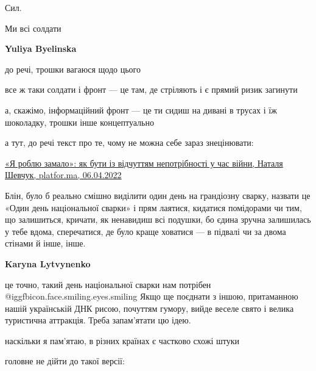  
 
 
 
 
\zzSecCmt

\begin{itemize} %
Сил.

Ми всі солдати

\textbf{Yuliya Byelinska} 

до речі, трошки вагаюся щодо цього

все ж таки солдати і фронт — це там, де стріляють і є прямий ризик загинути

а, скажімо, інформаційний фронт — це ти сидиш на дивані в трусах і їж
шоколадку, трошки інше концептуально

а тут, до речі текст про те, чому не можна себе зараз знецінювати:

\href{https://platfor.ma/topic/ya-roblyu-zamalo-yak-buty-iz-vidchuttyam-nepotribnosti-u-chas-vijny/}{%
«Я роблю замало»: як бути із відчуттям непотрібності у час війни, Наталя Шевчук, platfor.ma, 06.04.2022%
}


Блін, було б реально смішно виділити один день на грандіозну сварку, назвати це
«Один день національної сварки» і прям лаятися, кидатися помідорами чи тим, що
залишиться, кричати, як ненавидиш всі подушки, бо єдина зручна залишилась у
тебе вдома, сперечатися, де було краще ховатися — в підвалі чи за двома стінами
й інше, інше.

\begin{itemize} %
\textbf{Karyna Lytvynenko} 

це точно, такий день національної сварки нам потрібен @igg{fbicon.face.smiling.eyes.smiling}  Якщо ще поєднати з
іншою, притаманною нашій українській ДНК рисою, почуттям гумору, вийде веселе
свято і велика туристична аттракція. Треба запам'ятати цю ідею.


наскільки я пам'ятаю, в різних країнах є частково схожі штуки

головне не дійти до такої версії: 


\end{itemize}
\end{itemize}
